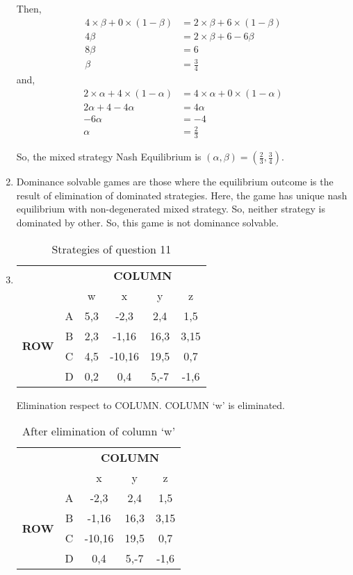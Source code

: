 \documentclass[a4paper,12pt]{article}
\begin{document}
\begin{enumerate}
Then,
\begin{align*}
4\times\beta + 0\times(1-\beta)  & = 2\times \beta + 6\times(1-\beta)\\
4\beta &=2\times\beta +6-6\beta\\
8\beta &=6\\
\beta &=\frac{3}{4}
\end{align*}
and,
\begin{align*}
2\times\alpha+4\times(1-\alpha) &=4\times \alpha+0\times(1-\alpha)\\
2\alpha+4-4\alpha &=4\alpha\\
-6\alpha &=-4\\
\alpha &=\frac{2}{3}
\end{align*}

So, the mixed strategy Nash Equilibrium is $(\alpha,\beta)=(\frac{2}{3},\frac{3}{4})$.
\item%
Dominance solvable games are those where the equilibrium outcome is the result of elimination of dominated strategies. Here, the game has unique nash equilibrium with non-degenerated mixed strategy. So, neither strategy is dominated by other. So, this game is not dominance solvable.
\item %
\begin{table}[H]
\centering
\begin{tabular}{@{}cccccc@{}}
\toprule
\multicolumn{2}{c}{} & \multicolumn{4}{c}{\bfseries COLUMN}\\
\multicolumn{2}{c}{} & w & x & y & z\\
\multirow{4}{*}{\bfseries ROW} & A & 5,3 & -2,3 & 2,4 & 1,5\\
 & B & 2,3 & -1,16 & 16,3 & 3,15\\
 & C & 4,5 & -10,16 & 19,5 & 0,7\\
 & D & 0,2 & 0,4 & 5,-7 & -1,6\\
 \bottomrule
\end{tabular}
\caption{Strategies of question 11}
\end{table}

Elimination respect to COLUMN. COLUMN `w' is eliminated.

\begin{table}[h]
\centering
\begin{tabular}{@{}ccccc@{}}
\toprule
\multicolumn{2}{c}{} & \multicolumn{3}{c}{\bfseries COLUMN}\\
\multicolumn{2}{c}{} & x & y & z\\
\multirow{4}{*}{\bfseries ROW} & A & -2,3 & 2,4 & 1,5\\
 & B & -1,16 & 16,3 & 3,15\\
 & C & -10,16 & 19,5 & 0,7\\
 & D & 0,4 & 5,-7 & -1,6\\
 \bottomrule
\end{tabular}
\caption{After elimination of column `w'}
\end{table}


\end{enumerate}
\end{document}
